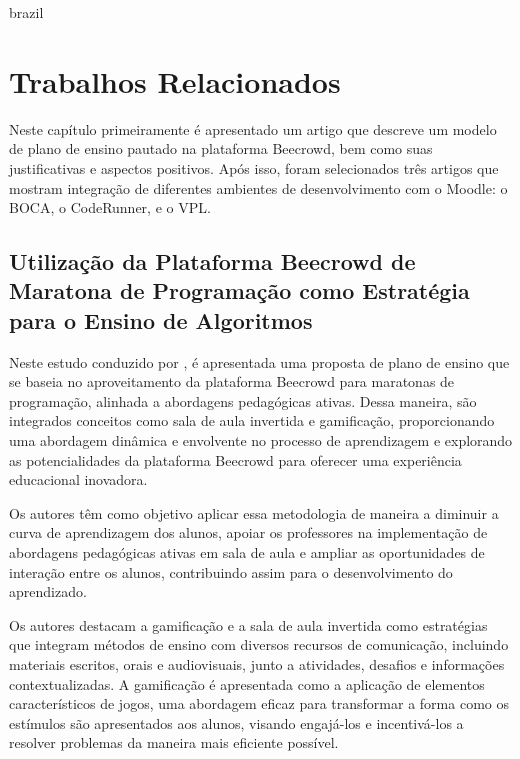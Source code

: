 

\begin{otherlanguage*}{brazil}

    \chapter{Trabalhos Relacionados}

    Neste capítulo primeiramente é apresentado um artigo que descreve um modelo de plano de ensino pautado na plataforma Beecrowd, bem como suas justificativas e aspectos positivos. Após isso, foram selecionados três artigos que mostram integração de diferentes ambientes de desenvolvimento com o Moodle: o BOCA, o CodeRunner, e o VPL.


\section{Utilização da Plataforma Beecrowd de Maratona de Programação como Estratégia para o Ensino de Algoritmos}

Neste estudo conduzido por \cite{cruz2022}, é apresentada uma proposta de plano de ensino que se baseia no aproveitamento da plataforma Beecrowd para maratonas de programação, alinhada a abordagens pedagógicas ativas. Dessa maneira, são integrados conceitos como sala de aula invertida e gamificação, proporcionando uma abordagem dinâmica e envolvente no processo de aprendizagem e explorando as potencialidades da plataforma Beecrowd para oferecer uma experiência educacional inovadora. 

Os autores têm como objetivo aplicar essa metodologia de maneira a diminuir a curva de aprendizagem dos alunos, apoiar os professores na implementação de abordagens pedagógicas ativas em sala de aula e ampliar as oportunidades de interação entre os alunos, contribuindo assim para o desenvolvimento do aprendizado.

Os autores destacam a gamificação e a sala de aula invertida como estratégias que integram métodos de ensino com diversos recursos de comunicação, incluindo materiais escritos, orais e audiovisuais, junto a atividades, desafios e informações contextualizadas. A gamificação é apresentada como a aplicação de elementos característicos de jogos, uma abordagem eficaz para transformar a forma como os estímulos são apresentados aos alunos, visando engajá-los e incentivá-los a resolver problemas da maneira mais eficiente possível. 


\end{otherlanguage*}

